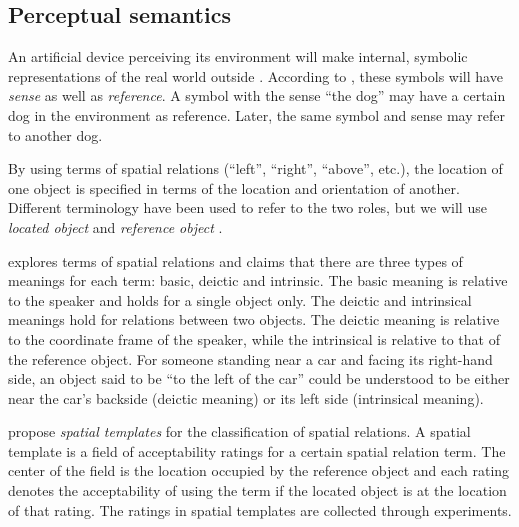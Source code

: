 \subsection{Perceptual semantics}
\label{sec:percsem}

An artificial device perceiving its environment will make internal, symbolic representations of the real world outside \citep{PustejovskyPerceptualsemanticsconstruction1990}.
According to \cite{FregeUberSinnUnd1892}, these symbols will have \textit{sense} as well as \textit{reference}.
A symbol with the sense ``the dog'' may have a certain dog in the environment as reference.
Later, the same symbol and sense may refer to another dog.

By using terms of spatial relations (``left'', ``right'', ``above'', etc.), the location of one object is specified in terms of the location and orientation of another.
Different terminology have been used to refer to the two roles, but we will use \textit{located object} and \textit{reference object} \citep{DobnikModellinglanguageaction2012}.

\cite{Garnhamunifiedtheorymeaning1989} explores terms of spatial relations and claims that there are three types of meanings for each term: basic, deictic and intrinsic.
The basic meaning is relative to the speaker and holds for a single object only.
The deictic and intrinsical meanings hold for relations between two objects.
The deictic meaning is relative to the coordinate frame of the speaker, while the intrinsical is relative to that of the reference object.
For someone standing near a car and facing its right-hand side, an object said to be ``to the left of the car'' could be understood to be either near the car's backside (deictic meaning) or its left side (intrinsical meaning).


\cite{LoganComputationalAnalysisApprehension1996} propose \textit{spatial templates} for the classification of spatial relations.
A spatial template is a field of acceptability ratings for a certain spatial relation term.
The center of the field is the location occupied by the reference object and each rating denotes the acceptability of using the term if the located object is at the location of that rating.
The ratings in spatial templates are collected through experiments.

